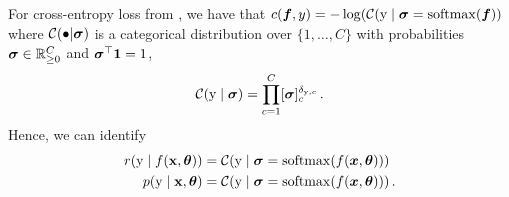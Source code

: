 \begin{example}
  For cross-entropy loss from , we have that $c({\bm{f}}, y) = - \log( {\mathcal{C}}({\textnormal{y}} \mid {\bm{\sigma}} = \mathrm{softmax}({\bm{f}}) )$ where ${\mathcal{C}}(\bullet | {\bm{\sigma}})$ is a categorical distribution over $\{1, \dots, C\}$ with probabilities ${\bm{\sigma}} \in {\mathbb{R}}^C_{\ge 0}$ and ${\bm{\sigma}}^\top {\bm{1}} = 1$,
  \begin{align*}
    {\mathcal{C}}({\textnormal{y}} \mid {\bm{\sigma}})
    =
    \prod_{c=1}^C [{\bm{\sigma}}]_c^{\delta_{{\textnormal{y}},c}}\,.
  \end{align*}
  Hence, we can identify
  \begin{align*}
    r({\textnormal{y}} \mid f({\mathbf{x}}, {\bm{\theta}})) &= {\mathcal{C}}({\textnormal{y}} \mid {\bm{\sigma}} = \mathrm{softmax}(f({\bm{x}}, {\bm{\theta}})))\,
    \\
    p({\textnormal{y}} \mid {\mathbf{x}}, {\bm{\theta}}) &= {\mathcal{C}}({\textnormal{y}} \mid {\bm{\sigma}} = \mathrm{softmax}(f({\bm{x}}, {\bm{\theta}})))\,.
  \end{align*}
\end{example}

